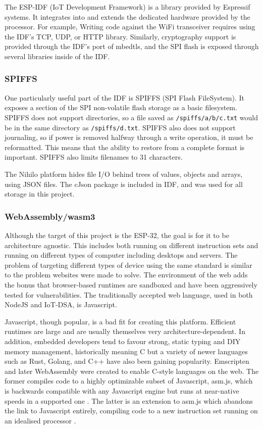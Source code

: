 \documentclass{article}
\begin{document}
The ESP-IDF (IoT Development Framework) is a library provided by Espressif systems. It integrates into and extends the dedicated hardware provided by the processor.
For example, Writing code against the WiFi transceiver requires using the IDF's TCP, UDP, or HTTP library.
Similarly, cryptography support is provided through the IDF's port of mbedtls, and the SPI flash is exposed through several libraries inside of the IDF.

\subsubsection{SPIFFS}

One particularly useful part of the IDF is SPIFFS (SPI Flash FileSystem).
It exposes a section of the SPI non-volatile flash storage as a basic filesystem.
SPIFFS does not support directories, so a file saved as \texttt{/spiffs/a/b/c.txt} would be in the same directory as \texttt{/spiffs/d.txt}.
SPIFFS also does not support journaling, so if power is removed halfway through a write operation, it must be reformatted.
This means that the ability to restore from a complete format is important.
SPIFFS also limits filenames to 31 characters.

The Nihilo platform hides file I/O behind trees of values, objects and arrays, using JSON files.
The cJson package is included in IDF, and was used for all storage in this project.

\subsubsection{WebAssembly/wasm3}

Although the target of this project is the ESP-32, the goal is for it to be architecture agnostic.
This includes both running on different instruction sets and running on different types of computer including desktops and servers.
The problem of targeting different types of device using the same standard is similar to the problem websites were made to solve.
The environment of the web adds the bonus that browser-based runtimes are sandboxed and have been aggressively tested for vulnerabilities.
The traditionally accepted web language, used in both NodeJS and IoT-DSA, is Javascript.

Javascript, though popular, is a bad fit for creating this platform.
Efficient runtimes are large and are usually themselves very architecture-dependent.
In addition, embedded developers tend to favour strong, static typing and DIY memory management, historically meaning C but a variety of newer languages such as Rust, Golang, and C++ have also been gaining popularity.
Emscripten and later WebAssembly were created to enable C-style languages on the web.
The former compiles code to a highly optimizable subset of Javascript, asm.js, which is backwards compatible with any Javascript engine but runs at near-native speeds in a supported one \cite{asm}.
The latter is an extension to asm.js which abandons the link to Javascript entirely, compiling code to a new instruction set running on an idealised processor \cite{wasm}.
\end{document}
